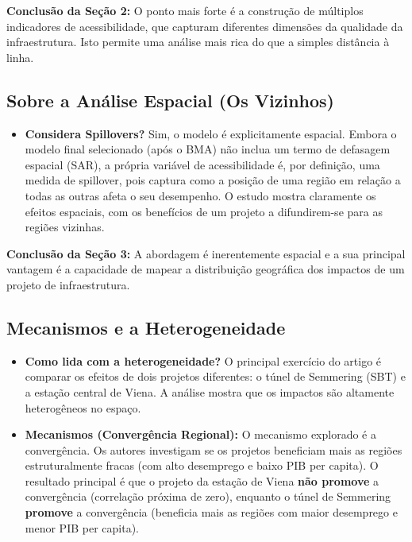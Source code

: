 \documentclass[12pt, a4paper]{article}
\begin{document}
\noindent\textbf{Conclusão da Seção 2:} O ponto mais forte é a construção de múltiplos indicadores de acessibilidade, que capturam diferentes dimensões da qualidade da infraestrutura. Isto permite uma análise mais rica do que a simples distância à linha.

\subsection{Sobre a Análise Espacial (Os Vizinhos)}

\begin{itemize}
    \item \textbf{Considera Spillovers?} Sim, o modelo é explicitamente espacial. Embora o modelo final selecionado (após o BMA) não inclua um termo de defasagem espacial (SAR), a própria variável de acessibilidade é, por definição, uma medida de spillover, pois captura como a posição de uma região em relação a todas as outras afeta o seu desempenho. O estudo mostra claramente os efeitos espaciais, com os benefícios de um projeto a difundirem-se para as regiões vizinhas.
\end{itemize}

\noindent\textbf{Conclusão da Seção 3:} A abordagem é inerentemente espacial e a sua principal vantagem é a capacidade de mapear a distribuição geográfica dos impactos de um projeto de infraestrutura.

\subsection{Mecanismos e a Heterogeneidade}

\begin{itemize}
    \item \textbf{Como lida com a heterogeneidade?} O principal exercício do artigo é comparar os efeitos de dois projetos diferentes: o túnel de Semmering (SBT) e a estação central de Viena. A análise mostra que os impactos são altamente heterogêneos no espaço.
    \item \textbf{Mecanismos (Convergência Regional):} O mecanismo explorado é a convergência. Os autores investigam se os projetos beneficiam mais as regiões estruturalmente fracas (com alto desemprego e baixo PIB per capita). O resultado principal é que o projeto da estação de Viena \textbf{não promove} a convergência (correlação próxima de zero), enquanto o túnel de Semmering \textbf{promove} a convergência (beneficia mais as regiões com maior desemprego e menor PIB per capita).
\end{itemize}
\end{document}
